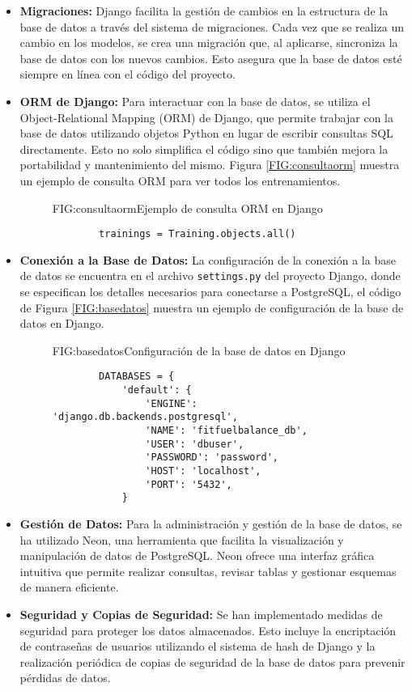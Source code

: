 \begin{itemize}
    \item \textbf{Migraciones:} Django facilita la gestión de cambios en la estructura de la base de datos a través del sistema de migraciones. Cada vez que se realiza un cambio en los modelos, se crea una migración que, al aplicarse, sincroniza la base de datos con los nuevos cambios. Esto asegura que la base de datos esté siempre en línea con el código del proyecto.

    \item \textbf{ORM de Django:} Para interactuar con la base de datos, se utiliza el Object-Relational Mapping (ORM) de Django, que permite trabajar con la base de datos utilizando objetos Python en lugar de escribir consultas SQL directamente. Esto no solo simplifica el código sino que también mejora la portabilidad y mantenimiento del mismo. Figura \ref{FIG:consultaorm} muestra un ejemplo de consulta ORM para ver todos los entrenamientos.
    \begin{figure}[Ejemplo Consulta ORM]{FIG:consultaorm}{Ejemplo de consulta ORM en Django}
    \begin{verbatim}
        trainings = Training.objects.all()
    \end{verbatim}
    \end{figure}

    \item \textbf{Conexión a la Base de Datos:} La configuración de la conexión a la base de datos se encuentra en el archivo \texttt{settings.py} del proyecto Django, donde se especifican los detalles necesarios para conectarse a PostgreSQL, el código de Figura \ref{FIG:basedatos} muestra un ejemplo de configuración de la base de datos en Django.
    \begin{figure}[Configuración Base de Datos]{FIG:basedatos}{Configuración de la base de datos en Django}
    \begin{verbatim}
        DATABASES = {
            'default': {
                'ENGINE': 'django.db.backends.postgresql',
                'NAME': 'fitfuelbalance_db',
                'USER': 'dbuser',
                'PASSWORD': 'password',
                'HOST': 'localhost',
                'PORT': '5432',
            }
        \end{verbatim}
    \end{figure}

    \item \textbf{Gestión de Datos:} Para la administración y gestión de la base de datos, se ha utilizado Neon, una herramienta que facilita la visualización y manipulación de datos de PostgreSQL. Neon ofrece una interfaz gráfica intuitiva que permite realizar consultas, revisar tablas y gestionar esquemas de manera eficiente.
    \item \textbf{Seguridad y Copias de Seguridad:} Se han implementado medidas de seguridad para proteger los datos almacenados. Esto incluye la encriptación de contraseñas de usuarios utilizando el sistema de hash de Django y la realización periódica de copias de seguridad de la base de datos para prevenir pérdidas de datos.
\end{itemize}